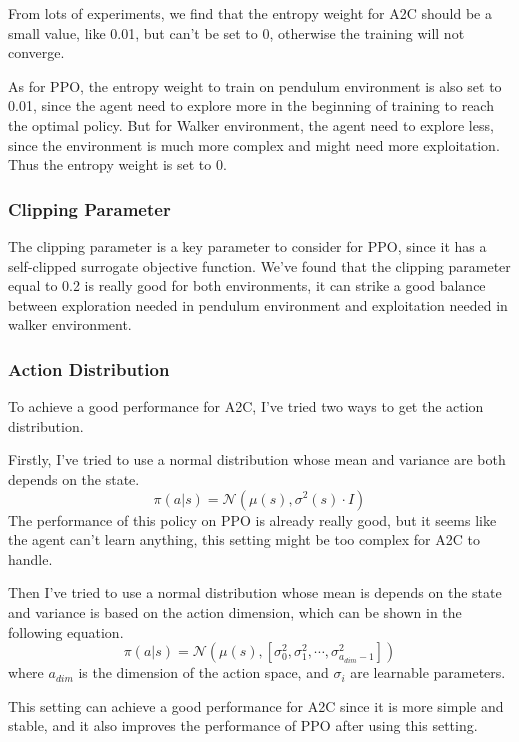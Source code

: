 From lots of experiments, we find that the entropy weight for A2C should be a small value, like 0.01, but can't be set to 0, otherwise the training will not converge.

As for PPO, the entropy weight to train on pendulum environment is also set to 0.01, since the agent need to explore more in the beginning of training to reach the optimal policy.
But for Walker environment, the agent need to explore less, since the environment is much more complex and might need more exploitation. Thus the entropy weight is set to 0.

\subsubsection{Clipping Parameter}
The clipping parameter is a key parameter to consider for PPO, since it has a self-clipped surrogate objective function.
We've found that the clipping parameter equal to 0.2 is really good for both environments, it can strike a good balance between exploration needed in pendulum environment and exploitation needed in walker environment.

\subsubsection{Action Distribution}
To achieve a good performance for A2C, I've tried two ways to get the action distribution.

Firstly, I've tried to use a normal distribution whose mean and variance are both depends on the state.
\begin{equation}
    \pi(a|s) = \mathcal{N}(\mu(s), \sigma^2(s) \cdot I)
\end{equation}
The performance of this policy on PPO is already really good, but it seems like the agent can't learn anything, this setting might be too complex for A2C to handle.

Then I've tried to use a normal distribution whose mean is depends on the state and variance is based on the action dimension, which can be shown in the following equation.
\begin{equation}
    \pi(a|s) = \mathcal{N}(\mu(s), \left[\sigma_0^2, \sigma_1^2, \cdots, \sigma_{a_{dim}-1}^2\right])
\end{equation}
where $a_{dim}$ is the dimension of the action space, and $\sigma_i$ are learnable parameters.

This setting can achieve a good performance for A2C since it is more simple and stable, and it also improves the performance of PPO after using this setting.

